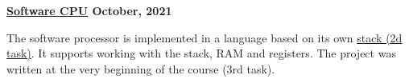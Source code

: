 \textbf{\href{https://github.com/jirol9xa/workingCpu} {Software CPU} \hfill  October, 2021} \par
\begin{itemize}
The software processor is implemented in a language based on its own \href{https://github.com/jirol9xa/stack} {stack (2d task)}. It supports working with the stack, RAM and registers. The project was written at the very beginning of the course (3rd task). 
\end{itemize} \par